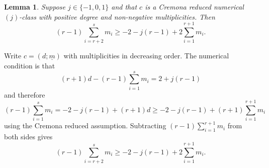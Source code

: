 \documentclass[12pt]{article}
\newtheorem{lemma}[equation]{Lemma}
\numberwithin{equation}{section}
\numberwithin{subeq}{equation}
\begin{document}
\begin{lemma}\label{CRnumjclass}
Suppose $j \in \{-1,0,1\}$ and that $c$ is a Cremona reduced numerical $(j)$-class
with positive degree and non-negative multiplicities.
Then
\[
(r-1)\sum_{i=r+2}^s m_i \geq -2 - j(r-1)+2\sum_{i=1}^{r+1}m_i.
\]

\end{lemma}

\medskip{}
Write $c = (d; \underline{m})$ with multiplicities in decreasing order.
The numerical condition is that
\[
(r+1)d - (r-1)\sum_{i=1}^s m_i = 2+j(r-1)
\]
and therefore
\[
(r-1)\sum_{i=1}^s m_i = -2-j(r-1)+(r+1)d \geq -2 - j(r-1)+ (r+1)\sum_{i=1}^{r+1}m_i
\]
using the Cremona reduced assumption.  Subtracting $(r-1)\sum_{i=1}^{r+1}m_i$
from both sides gives
\[
(r-1)\sum_{i=r+2}^s m_i \geq -2 - j(r-1)+2\sum_{i=1}^{r+1}m_i.
\]

\end{document}
